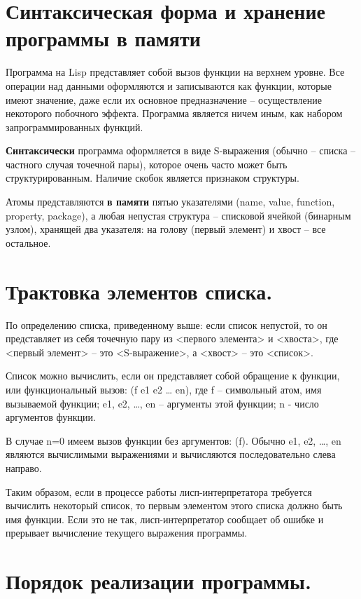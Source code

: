 \documentclass{article}
\begin{document}
\section*{Синтаксическая форма и хранение программы в памяти}

Программа на Lisp представляет собой вызов функции на верхнем уровне. Все операции над данными оформляются и  записываются как функции, которые имеют значение, даже если их основное предназначение – осуществление некоторого побочного эффекта. Программа является ничем иным, как набором запрограммированных функций.

\textbf{Синтаксически} программа оформляется в виде S-выражения (обычно -- списка -- частного случая точечной пары), которое очень часто может быть структурированным. Наличие скобок является признаком структуры. 



Атомы представляются \textbf{в памяти} пятью указателями  (name, value, function, property, package), а любая непустая структура --  списковой ячейкой (бинарным узлом), хранящей два указателя: на голову (первый элемент) и хвост -- все остальное.


\section*{Трактовка элементов списка.}

По определению списка, приведенному выше: если список непустой, то он представляет из себя точечную пару из  <первого элемента> и <хвоста>, где <первый элемент> -- это <S-выражение>, а <хвост> -- это <список>.

Список можно вычислить, если он представляет собой обращение к  функции, или функциональный вызов: (f e1 e2 … en), где f – символьный атом, имя вызываемой функции; e1, e2, …, en – аргументы этой функции; n - число аргументов функции.

В случае n=0 имеем вызов функции без аргументов: (f). Обычно e1, e2, …, en являются вычислимыми выражениями и вычисляются последовательно слева направо.

Таким образом, если в процессе работы лисп-интерпретатора  требуется вычислить некоторый список, то первым элементом этого   списка должно быть имя функции. Если это не так, лисп-интерпретатор  сообщает об ошибке и прерывает вычисление текущего выражения  программы.


\section*{Порядок реализации программы.}
\end{document}
